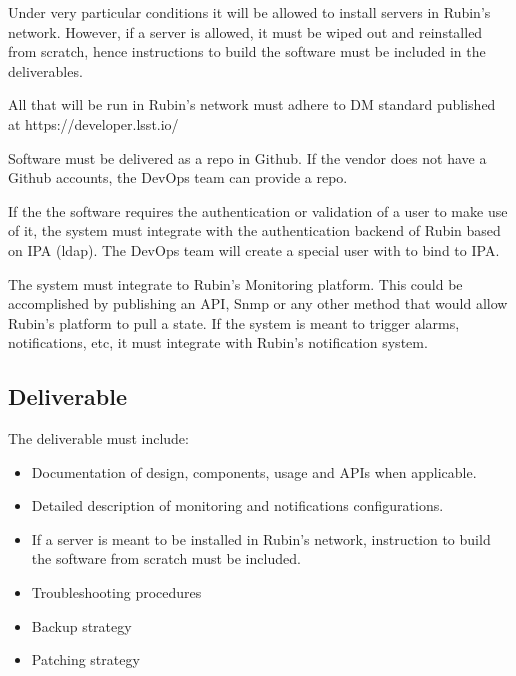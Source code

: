 Under very particular conditions it will be allowed to install servers in Rubin's network. However, if a server is allowed, it must be wiped out and reinstalled from scratch, hence instructions to build the software must be included in the deliverables. 

All that will be run in Rubin's network must adhere to DM standard published at https://developer.lsst.io/

Software must be delivered as a repo in Github. If the vendor does not have a Github accounts, the DevOps team can provide a repo. 

If the the software requires the authentication or validation of a user to make use of it, the system must integrate with the authentication backend of Rubin based on IPA (ldap). The DevOps team will create a special user with to bind to IPA. 

The system must integrate to Rubin’s Monitoring platform. This could be accomplished by publishing an API, Snmp or any other method that would allow Rubin’s platform to pull a state. If the system is meant to trigger alarms, notifications, etc, it must integrate with Rubin’s notification system. 

\subsection{Deliverable}

The deliverable must include:

\begin{itemize}
    \item Documentation of design, components, usage and APIs when applicable.
    \item  Detailed description of monitoring and notifications configurations. 
    \item If a server is meant to be installed in Rubin's network, instruction to build the software from scratch must be included. 
    \item Troubleshooting procedures
    \item Backup strategy
    \item Patching strategy	
\end{itemize}
	

